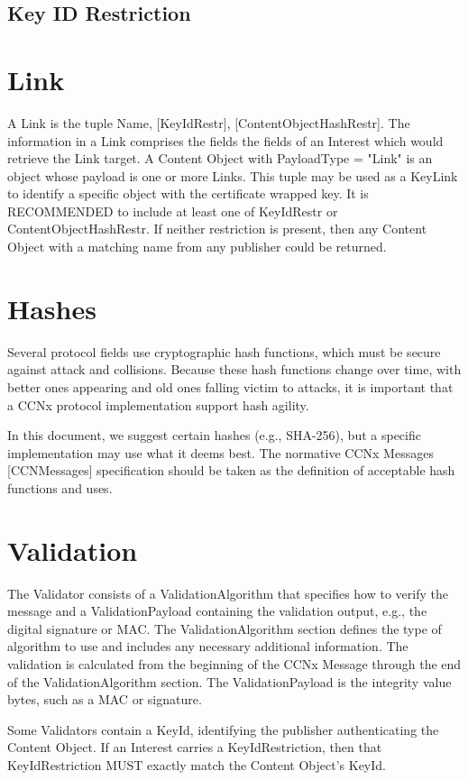 \documentclass[12pt]{article}
\begin{document}
\subsection{Key ID Restriction}

\section{Link}
A Link is the tuple {Name, [KeyIdRestr], [ContentObjectHashRestr]}.
The information in a Link comprises the fields the fields of an
Interest which would retrieve the Link target.  A Content Object with
PayloadType = "Link" is an object whose payload is one or more Links.
This tuple may be used as a KeyLink to identify a specific object
with the certificate wrapped key.  It is RECOMMENDED to include at
least one of KeyIdRestr or ContentObjectHashRestr.  If neither
restriction is present, then any Content Object with a matching name
from any publisher could be returned.

\section{Hashes}
Several protocol fields use cryptographic hash functions, which must
be secure against attack and collisions.  Because these hash
functions change over time, with better ones appearing and old ones
falling victim to attacks, it is important that a CCNx protocol
implementation support hash agility.

In this document, we suggest certain hashes (e.g., SHA-256), but a
specific implementation may use what it deems best.  The normative
CCNx Messages [CCNMessages] specification should be taken as the
definition of acceptable hash functions and uses.

\section{Validation}
The Validator consists of a ValidationAlgorithm that specifies how to
verify the message and a ValidationPayload containing the validation
output, e.g., the digital signature or MAC.  The ValidationAlgorithm
section defines the type of algorithm to use and includes any
necessary additional information.  The validation is calculated from
the beginning of the CCNx Message through the end of the
ValidationAlgorithm section.  The ValidationPayload is the integrity
value bytes, such as a MAC or signature.

Some Validators contain a KeyId, identifying the publisher
authenticating the Content Object.  If an Interest carries a
KeyIdRestriction, then that KeyIdRestriction MUST exactly match the
Content Object's KeyId.
\end{document}
